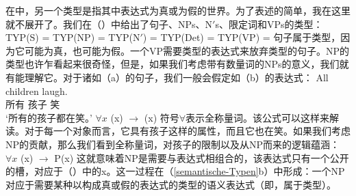 在中，另一个类型是指其中表达式为真或为假的世界。为了表述的简单，我在这里就不展开了。我们在（）中给出了句子、NPs、N$'$s、限定词和VPs的类型：
\eal
\label{semantische-Typen}
\ex TYP(S)   = 
\ex TYP(NP)  = 
\ex TYP(N$'$)  = 
\ex TYP(Det) = 
\ex TYP(VP)  = 
\zl
句子属于类型，因为它可能为真，也可能为假。一个VP需要类型的表达式来放弃类型的句子。NP的类型也许乍看起来很奇怪，但是，如果我们考虑带有数量词的NPs的意义，我们就有能理解它。对于诸如（a）的句子，我们一般会假定如（b）的表达式：
\eal
\ex 
\gll All children laugh.\\
所有 孩子 笑\\
\glt `所有的孩子都在笑。'
\ex $\forall x$ (x) $\to$ (x)
\zl
符号$\forall$表示全称量词。该公式可以这样来解读。对于每一个对象而言，它具有孩子这样的属性，而且它也在笑。如果我们考虑NP的贡献，那么我们看到全称量词，对孩子的限制以及从NP而来的逻辑蕴涵：
\ea
$\forall x$ (x) $\to$ P(x)
\z
这就意味着NP是需要与表达式相组合的，该表达式只有一个公开的槽，对应于（）中的x。这一过程在（\ref{semantische-Typen}b）中形成：一个NP对应于需要某种以构成真或假的表达式的类型的语义表达式（即，属于类型）。

